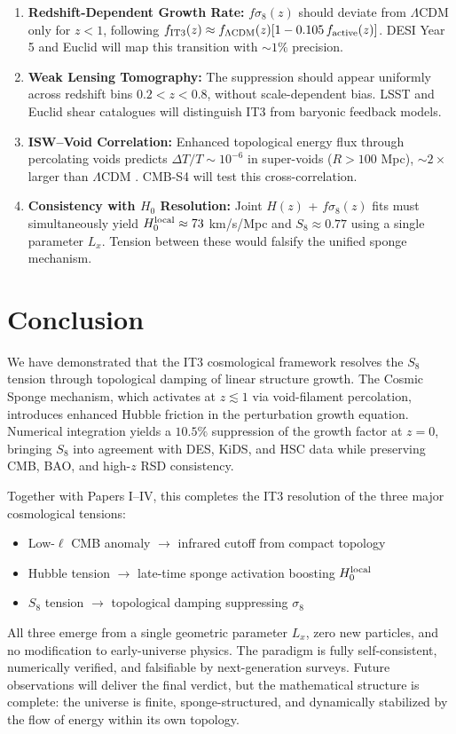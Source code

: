 \documentclass[12pt,a4paper]{article}
\begin{document}
\begin{enumerate}
\item \textbf{Redshift-Dependent Growth Rate:} $f\sigma_8(z)$ should deviate from $\Lambda$CDM only for $z < 1$, following $f_{\rm IT3}(z) \approx f_{\Lambda{\rm CDM}}(z)[1 - 0.105\,f_{\rm active}(z)]$. DESI Year 5 and Euclid will map this transition with $\sim 1\%$ precision.

\item \textbf{Weak Lensing Tomography:} The suppression should appear uniformly across redshift bins $0.2 < z < 0.8$, without scale-dependent bias. LSST and Euclid shear catalogues will distinguish IT3 from baryonic feedback models.

\item \textbf{ISW--Void Correlation:} Enhanced topological energy flux through percolating voids predicts $\Delta T/T \sim 10^{-6}$ in super-voids ($R > 100$ Mpc), $\sim 2\times$ larger than $\Lambda$CDM \citep{Logvinovich2026d}. CMB-S4 will test this cross-correlation.

\item \textbf{Consistency with $H_0$ Resolution:} Joint $H(z)$ + $f\sigma_8(z)$ fits must simultaneously yield $H_0^{\rm local} \approx 73$ km/s/Mpc and $S_8 \approx 0.77$ using a single parameter $L_x$. Tension between these would falsify the unified sponge mechanism.
\end{enumerate}

\section{Conclusion}

We have demonstrated that the IT3 cosmological framework resolves the $S_8$ tension through topological damping of linear structure growth. The Cosmic Sponge mechanism, which activates at $z \lesssim 1$ via void-filament percolation, introduces enhanced Hubble friction in the perturbation growth equation. Numerical integration yields a $10.5\%$ suppression of the growth factor at $z=0$, bringing $S_8$ into agreement with DES, KiDS, and HSC data while preserving CMB, BAO, and high-$z$ RSD consistency.

Together with Papers I--IV, this completes the IT3 resolution of the three major cosmological tensions:
\begin{itemize}
\item Low-$\ell$ CMB anomaly $\rightarrow$ infrared cutoff from compact topology
\item Hubble tension $\rightarrow$ late-time sponge activation boosting $H_0^{\rm local}$
\item $S_8$ tension $\rightarrow$ topological damping suppressing $\sigma_8$
\end{itemize}
All three emerge from a single geometric parameter $L_x$, zero new particles, and no modification to early-universe physics. The paradigm is fully self-consistent, numerically verified, and falsifiable by next-generation surveys. Future observations will deliver the final verdict, but the mathematical structure is complete: the universe is finite, sponge-structured, and dynamically stabilized by the flow of energy within its own topology.
\end{document}
